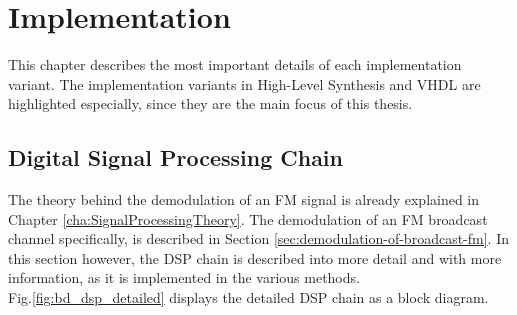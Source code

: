 \chapter{Implementation}
\label{cha:Implementation}

This chapter describes the most important details of each implementation variant.
The implementation variants in High-Level Synthesis and VHDL are highlighted especially, since they are the main focus of this thesis.

\section{Digital Signal Processing Chain}

The theory behind the demodulation of an FM signal is already explained in Chapter \ref{cha:SignalProcessingTheory}.
The demodulation of an FM broadcast channel specifically, is described in Section \ref{sec:demodulation-of-broadcast-fm}.
In this section however, the DSP chain is described into more detail and with more information, as it is implemented in the various methods.\\

\noindent
Fig.\ref{fig:bd_dsp_detailed} displays the detailed DSP chain as a block diagram.\\


